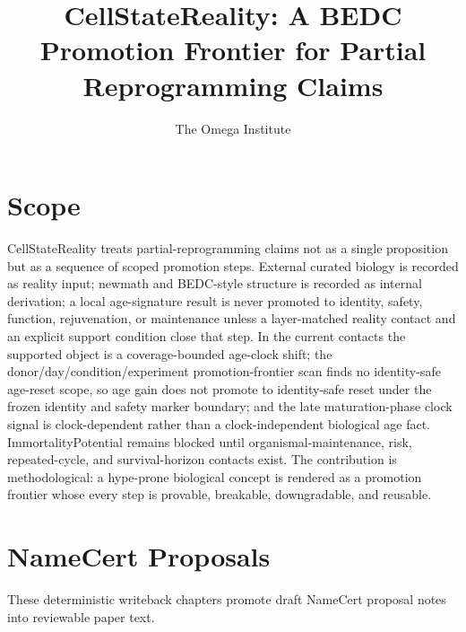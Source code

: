 \documentclass[11pt]{article}
\title{CellStateReality: A BEDC Promotion Frontier for Partial Reprogramming Claims}
\author{The Omega Institute}
\date{}
\begin{document}
\maketitle

\section{Scope}
CellStateReality treats partial-reprogramming claims not as a single proposition but as a sequence of scoped promotion steps. External curated biology is recorded as reality input; newmath and BEDC-style structure is recorded as internal derivation; a local age-signature result is never promoted to identity, safety, function, rejuvenation, or maintenance unless a layer-matched reality contact and an explicit support condition close that step. In the current contacts the supported object is a coverage-bounded age-clock shift; the donor/day/condition/experiment promotion-frontier scan finds no identity-safe age-reset scope, so age gain does not promote to identity-safe reset under the frozen identity and safety marker boundary; and the late maturation-phase clock signal is clock-dependent rather than a clock-independent biological age fact. ImmortalityPotential remains blocked until organismal-maintenance, risk, repeated-cycle, and survival-horizon contacts exist. The contribution is methodological: a hype-prone biological concept is rendered as a promotion frontier whose every step is provable, breakable, downgradable, and reusable.





\section{NameCert Proposals}
These deterministic writeback chapters promote draft NameCert proposal notes into reviewable paper text.




\end{document}
